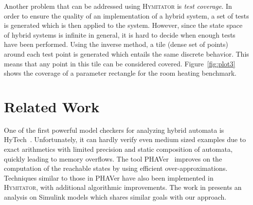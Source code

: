 \documentclass{llncs}
\newcommand{\hytech}{{\sc HyTech}}
\newcommand{\hymitator}{\textsc{Hymitator}}
\newcommand{\phaver}{PHAVer}
\newcommand{\commentaire}[1]{}
\begin{document}
% 


Another problem that can be addressed using \hymitator{} is \emph{test   coverage}.
In order to ensure the quality of an implementation of a hybrid system, a set of tests is generated which is then applied to the system.
However, since the state space of hybrid systems is infinite in general, it is hard to decide when enough tests have been performed.
Using the inverse method, a tile (dense set of points) around each test point is generated which entails the same discrete behavior.
This means that any point in this tile can be considered covered.
Figure~\ref{fig:plot3} shows the coverage of a parameter rectangle for the room heating benchmark.


\commentaire{experiences ?}

\commentaire{rapport d'etudes de cas a rediger}



\section{Related Work}

\vspace{-0.1cm}

One of the first powerful model checkers for analyzing hybrid automata is \hytech{}~\cite{hhw97}.
Unfortunately, it can hardly verify even medium sized examples due to exact arithmetics with limited precision and static composition of automata, quickly leading to memory overflows. The tool \phaver{}~\cite{Frehse08} improves on the computation of the reachable states by using efficient over-approximations. Techniques similar to those in \phaver{} have also been implemented in \hymitator{}, with additional algorithmic improvements. The work in \cite{akrs08} presents an analysis on Simulink models which shares similar goals with our approach.
\end{document}
